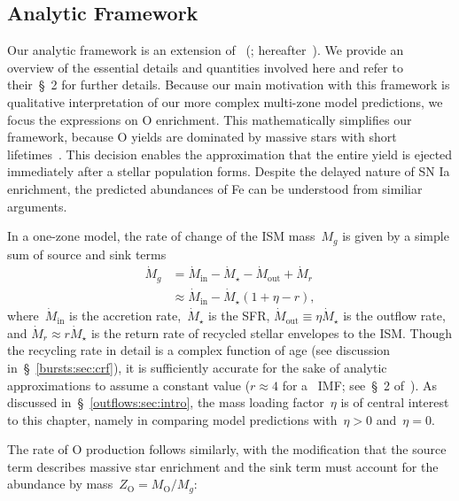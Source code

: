 \subsection{Analytic Framework}
\label{outflows:sec:gce:onezone}
Our analytic framework is an extension of~\citeauthor{Weinberg2017b}
(\citeyear{Weinberg2017b}; hereafter~).
We provide an overview of the essential details and quantities involved here
and refer to their~\S~2 for further details.
Because our main motivation with this framework is qualitative interpretation
of our more complex multi-zone model predictions, we focus the expressions on
O enrichment.
This mathematically simplifies our framework, because O yields are dominated by
massive stars with short lifetimes~\citep[e.g.,][]{Johnson2019}.
This decision enables the approximation that the entire yield is ejected
immediately after a stellar population forms.
Despite the delayed nature of SN Ia enrichment, the predicted abundances of Fe
can be understood from similiar arguments.
\par
In a one-zone model, the rate of change of the ISM mass~$M_g$ is given by a
simple sum of source and sink terms
\begin{equation}\begin{split}
\dot{M}_g &= \dot{M}_\text{in} - \dot{M}_\star - \dot{M}_\text{out} +
\dot{M}_r
\\
&\approx \dot{M}_\text{in} - \dot{M}_\star(1 + \eta - r),
\label{outflows:eq:mdot-gas-noflow}
\end{split}\end{equation}
where~$\dot{M}_\text{in}$ is the accretion rate,~$\dot{M}_\star$ is the SFR,
$\dot{M}_\text{out} \equiv \eta \dot{M}_\star$ is the outflow rate, and
$\dot{M}_r \approx r\dot{M}_\star$ is the return rate of recycled stellar
envelopes to the ISM.
Though the recycling rate in detail is a complex function of age (see
discussion in~\S~\ref{bursts:sec:crf}), it is sufficiently accurate for the
sake of analytic approximations to assume a constant value ($r \approx 4$ for
a~\citealt{Kroupa2001} IMF; see~\S~2 of~).
As discussed in~\S~\ref{outflows:sec:intro}, the mass loading factor~$\eta$ is
of central interest to this chapter, namely in comparing model predictions
with~$\eta > 0$ and~$\eta = 0$.
\par
The rate of O production follows similarly, with the modification that the
source term describes massive star enrichment and the sink term must account
for the abundance by mass~$Z_\text{O} = M_\text{O} / M_g$:
